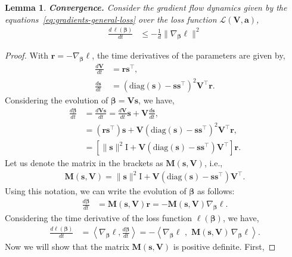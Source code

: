 \documentclass[10pt,a4paper]{amsart}
\newtheorem{lemma}{Lemma}
\newcommand{\I}{\mathrm{I}}
\newcommand{\MM}{\mathbf{M}}
\newcommand{\VV}{\mathbf{V}}
\renewcommand{\aa}{\bm{a}}
\newcommand{\bbeta}{\bm{\beta}}
\newcommand{\bloss}{\ell}
\newcommand{\diag}[1]{\mathrm{diag}\left(#1\right)}
\renewcommand\leq{\leqslant}
\newcommand{\loss}{\mathcal{L}}
\providecommand{\nor}[1]{\bigl\|{#1}\bigr\|}
\newcommand{\rrr}{\bm{r}}
\providecommand{\scal}[2]{\left\langle{#1},{#2}\right\rangle}
\newcommand{\sos}{\bm{s}}
\begin{document}
\begin{lemma}\label{lem:convergence-general-loss}\textbf{Convergence.}
Consider the gradient flow dynamics given by the equations~\eqref{eq:gradients-general-loss} over the loss function $\loss(\VV, \aa)$, 
\begin{align*}
    \frac{d \, \bloss(\bbeta)}{dt} &\leq - \frac{1}{d} \nor{\nabla_{\bbeta} \bloss}^2 
\end{align*} 
\end{lemma}

\begin{proof}
    With $\rrr = - \nabla_{\bbeta} \bloss $, the time derivatives of the parameters are given by, 
    \begin{align*}
        \frac{d\VV}{dt} &=  \rrr \sos^{\top},  \\
        \frac{d\sos}{dt} &=  \left( \diag{\sos} - \sos \sos^{\top} \right)^2 \VV^{\top} \rrr.
    \end{align*}
    Considering the evolution of $\bbeta = \VV \sos$, we have,
    \begin{align*}
        \frac{d \bbeta}{dt} &= \frac{d \VV \sos}{dt} = \frac{d\VV}{dt} \sos + \VV \frac{d\sos}{dt}, \\
        &= \left( \rrr \sos^{\top} \right) \sos + \VV \left( \diag{\sos} - \sos \sos^{\top} \right)^2 \VV^{\top} \rrr, \\
        &= \left[ \nor{\sos}^2 \I +  \VV \left( \diag{\sos} - \sos \sos^{\top} \right) \VV^{\top} \right] \rrr. 
    \end{align*}
    Let us denote the matrix in the brackets as $\MM(\sos, \VV)$, i.e., 
    \begin{align*}
        \MM(\sos, \VV) = \nor{\sos}^2 \I +  \VV \left( \diag{\sos} - \sos \sos^{\top} \right) \VV^{\top}.
    \end{align*}    
    Using this notation, we can write the evolution of $\bbeta$ as follows:
    \begin{align*}
        \frac{d \bbeta}{dt} &=  \MM(\sos, \VV) \rrr = - \MM(\sos, \VV) \nabla_{\bbeta} \bloss. 
    \end{align*}
    Considering the time derivative of the loss function $\bloss(\bbeta)$, we have,
    \begin{align*}
        \frac{d \bloss(\bbeta)}{dt} &= \scal{\nabla_{\bbeta} \bloss}{\frac{d \bbeta}{dt}} = - \scal{\nabla_{\bbeta} \bloss \, \, }{\, \, \MM(\sos, \VV) \, \nabla_{\bbeta} \bloss}. 
    \end{align*}
    Now we will show that the matrix $\MM(\sos, \VV)$ is positive definite. First, 

\end{proof}
\end{document}
